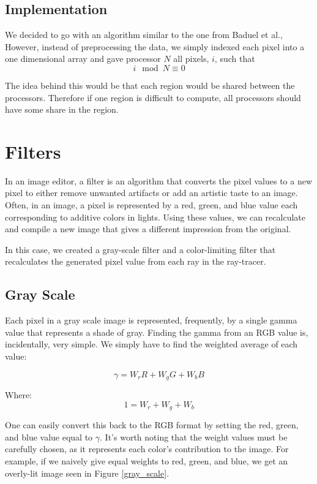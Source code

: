\documentclass{acmsiggraph}
\begin{document}
\subsection{Implementation}
We decided to go with an algorithm similar to the one from Baduel et
al., However, instead of preprocessing the data, we simply indexed each pixel
into a one dimensional array and gave processor $N$ all pixels, $i$, such that
\begin{equation}
i \mod{N} \equiv 0
\end{equation}

The idea behind this would be that each region would be shared between the
processors. Therefore if one region is difficult to compute, all processors
should have some share in the region.

\section{Filters}
In an image editor, a filter is an algorithm that converts the pixel values to
a new pixel to either remove unwanted artifacts or add an artistic taste to an
image.  Often, in an image, a pixel is represented by a red, green, and blue
value each corresponding to additive colors in lights.  Using these values, we
can recalculate and compile a new image that gives a different impression from
the original.

In this case, we created a gray-scale filter and a color-limiting filter that
recalculates the generated pixel value from each ray in the ray-tracer.


\subsection{Gray Scale}
Each pixel in a gray scale image is represented, frequently, by a single gamma
value that represents a shade of gray.  Finding the gamma from an RGB value
is, incidentally, very simple.  We simply have to find the weighted average of
each value:

\begin{equation}
\gamma = W_{r}R + W_{g}G + W_{b}B
\end{equation}

Where:
\begin{equation}
1 = W_{r} + W_{g} + W_{b}
\end{equation}

One can easily convert this back to the RGB format by setting the red, green,
and blue value equal to $\gamma$.  It's worth noting that the weight values
must be carefully chosen, as it represents each color's contribution to the
image.  For example, if we naively give equal weights to red, green, and blue,
we get an overly-lit image seen in Figure \ref{gray_scale}.
\end{document}
